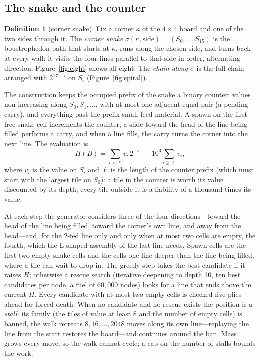 \documentclass[11pt]{article}
\theoremstyle{definition}
\newtheorem{definition}[theorem]{Definition}
\theoremstyle{remark}
\begin{document}
\subsection{The snake and the counter}

\begin{definition}[corner snake]\label{def:snake}
Fix a corner $\kappa$ of the $4\times4$ board and one of the two sides
through it. The \emph{corner snake} $\sigma(\kappa,\text{side})=
(S_0,\dots,S_{15})$ is the boustrophedon path that starts at $\kappa$, runs
along the chosen side, and turns back at every wall: it visits the four
lines parallel to that side in order, alternating direction.
Figure~\ref{fig:eight} shows all eight. The \emph{chain along $\sigma$} is
the full chain arranged with $2^{17-i}$ on $S_i$ (Figure~\ref{fig:spiral}).
\end{definition}

The construction keeps the occupied prefix of the snake a binary counter:
values non-increasing along $S_0,S_1,\dots$, with at most one adjacent
equal pair (a pending carry), and everything past the prefix small feed
material. A spawn on the first free snake cell increments the counter, a
slide toward the head of the line being filled performs a carry, and when
a line fills, the carry turns the corner into the next line. The
evaluation is
\[
H(B)=\sum_{i<\ell}v_i\,2^{-i}\;-\;10^{3}\sum_{i\ge\ell}v_i ,
\]
where $v_i$ is the value on $S_i$ and $\ell$ is the length of the counter
prefix (which must start with the largest tile on $S_0$): a tile in the
counter is worth its value discounted by its depth, every tile outside it
is a liability of a thousand times its value.

At each step the generator considers three of the four directions---toward
the head of the line being filled, toward the corner's own line, and away
from the head---and, for the 2-fed line only and only when at most two
cells are empty, the fourth, which the L-shaped assembly of the last line
needs. Spawn cells are the first two empty snake cells and the cells one
line deeper than the line being filled, where a tile can wait to drop in.
The greedy step takes the best candidate if it raises $H$; otherwise a
rescue search (iterative deepening to depth 10, ten best candidates per
node, a fuel of $60{,}000$ nodes) looks for a line that ends above the
current $H$. Every candidate with at most two empty cells is checked five
plies ahead for forced death. When no candidate and no rescue exists the
position is a \emph{stall}: its family (the tiles of value at least 8 and
the number of empty cells) is banned, the walk retreats $8,16,\dots,2048$
moves along its own line---replaying the line from the start restores the
board---and continues around the ban. Mass grows every move, so the walk
cannot cycle; a cap on the number of stalls bounds the work.
\end{document}
